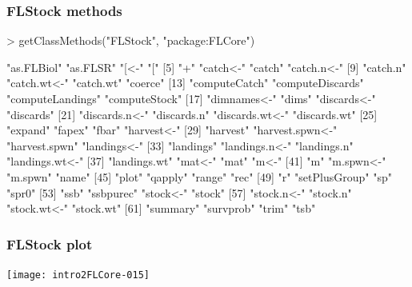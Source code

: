 \documentclass{beamer}%
\begin{document}
\begin{frame}[containsverbatim]
  \frametitle{FLStock methods}

{\tiny{
\begin{Schunk}
\begin{Sinput}
> getClassMethods("FLStock", "package:FLCore")
\end{Sinput}
\begin{Soutput}
 [1] "as.FLBiol"       "as.FLSR"         "[<-"             "["              
 [5] "+"               "catch<-"         "catch"           "catch.n<-"      
 [9] "catch.n"         "catch.wt<-"      "catch.wt"        "coerce"         
[13] "computeCatch"    "computeDiscards" "computeLandings" "computeStock"   
[17] "dimnames<-"      "dims"            "discards<-"      "discards"       
[21] "discards.n<-"    "discards.n"      "discards.wt<-"   "discards.wt"    
[25] "expand"          "fapex"           "fbar"            "harvest<-"      
[29] "harvest"         "harvest.spwn<-"  "harvest.spwn"    "landings<-"     
[33] "landings"        "landings.n<-"    "landings.n"      "landings.wt<-"  
[37] "landings.wt"     "mat<-"           "mat"             "m<-"            
[41] "m"               "m.spwn<-"        "m.spwn"          "name"           
[45] "plot"            "qapply"          "range"           "rec"            
[49] "r"               "setPlusGroup"    "sp"              "spr0"           
[53] "ssb"             "ssbpurec"        "stock<-"         "stock"          
[57] "stock.n<-"       "stock.n"         "stock.wt<-"      "stock.wt"       
[61] "summary"         "survprob"        "trim"            "tsb"            
\end{Soutput}
\end{Schunk}
}}

\end{frame}

\begin{frame}
  \frametitle{FLStock plot}

\texttt{[image: intro2FLCore-015]}

\end{frame}
\end{document}
